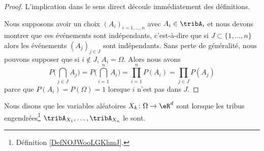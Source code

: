 \begin{proof}
	L'implication dans le sens direct découle immédiatement des définitions.

	Nous supposons avoir un choix \( (A_i)_{i=1,\ldots,n}\) avec \( A_i\in\tribA_i\) et nous devons montrer que ces événements sont indépendants, c'est-à-dire que si \( J\subset\{ 1,\ldots,n \}\) alors les événements \( (A_j)_{j\in J}\) sont indépendants. Sans perte de généralité, nous pouvons supposer que si \( i\notin J\), \( A_i=\Omega\). Alors nous avons
	\begin{equation}
		P\big( \bigcap_{j\in J}A_j \big)=P\big( \bigcap_{i=1}^nA_i \big)=\prod_{i=1}^nP(A_i)=\prod_{j\in J}P(A_j)
	\end{equation}
	parce que \( P(A_i)=P(\Omega)=1\) lorsque \( i\) n'est pas dans \( J\).
\end{proof}

\begin{definition}  \label{DefNJUkotc}
	Nous disons que les variables aléatoires \( X_k\colon \Omega\to \eR^d\) sont  lorsque les tribus engendrées\footnote{Définition \ref{DefNOJWooLGKhmJ}.} \( \tribA_{X_1},\ldots,\tribA_{X_n}\) le sont.
\end{definition}

